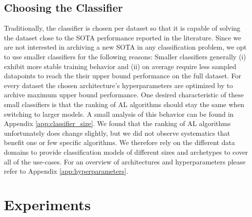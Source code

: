 \documentclass[]{article}
\begin{document}
\subsection{Choosing the Classifier}\label{sec:choosing_the_classifier}
Traditionally, the classifier is chosen per dataset so that it is capable of solving the dataset close to the SOTA performance reported in the literature.
Since we are not interested in archiving a new SOTA in any classification problem, we opt to use smaller classifiers for the following reasons:
Smaller classifiers generally (i) exhibit more stable training behavior and (ii) on average require less sampled datapoints to reach the their upper bound performance on the full dataset.
For every dataset the chosen architecture's hyperparameters are optimized by to archive maximum upper bound performance.
One desired characteristic of these small classifiers is that the ranking of AL algorithms should stay the same when switching to larger models.
A small analysis of this behavior can be found in Appendix \ref{app:classifier_size}.
We found that the ranking of AL algorithms unfortunately does change slightly, but we did not observe systematics that benefit one or few specific algorithms.
We therefore rely on the different data domains to provide classification models of different sizes and archetypes to cover all of the use-cases.
For an overview of architectures and hyperparameters please refer to Appendix \ref{app:hyperparameters}.

\section{Experiments}
\end{document}
